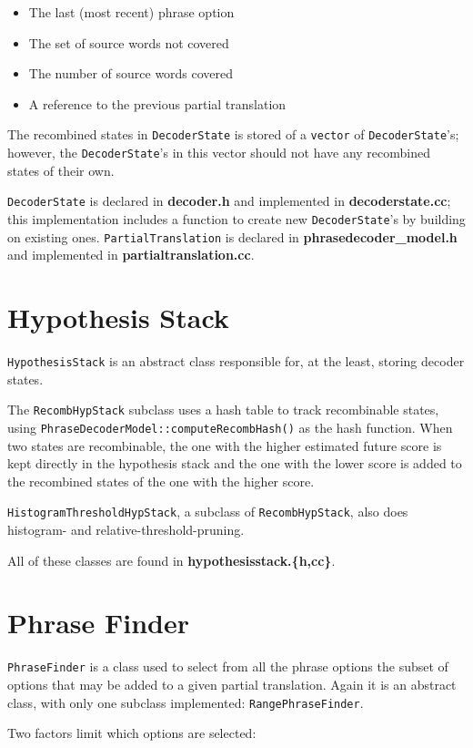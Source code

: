 \documentclass[12pt]{amsart} \usepackage{epsfig} \usepackage{rotating}
\newcommand{\file}{\textbf} \newcommand{\url}{\underline}
\newcommand{\code}{\small\texttt}
\begin{document}
\begin{itemize}
\item The last (most recent) phrase option
\item The set of source words not covered
\item The number of source words covered
\item A reference to the previous partial translation
\end{itemize}

The recombined states in \code{DecoderState} is stored of a \code{vector} of
\code{DecoderState}'s; however, the \code{DecoderState}'s in this vector should
not have any recombined states of their own.

\code{DecoderState} is declared in \file{decoder.h} and implemented in
\file{decoderstate.cc}; this implementation includes a function to create new
\code{DecoderState}'s by building on existing ones.  \code{PartialTranslation}
is declared in \file{phrasedecoder\_model.h} and implemented in
\file{partialtranslation.cc}.

\section{Hypothesis Stack}
\code{HypothesisStack} is an abstract class responsible for, at the least,
storing decoder states.

The \code{RecombHypStack} subclass uses a hash table to track recombinable
states, using \code{PhraseDecoderModel::computeRecombHash()} as the hash
function.  When two states are recombinable, the one with the higher estimated
future score is kept directly in the hypothesis stack and the one with the
lower score is added to the recombined states of the one with the higher score.

\code{HistogramThresholdHypStack}, a subclass of \code{RecombHypStack}, also
does histogram- and relative-threshold-pruning.

All of these classes are found in \file{hypothesisstack.\{h,cc\}}.

\section{Phrase Finder}
\code{PhraseFinder} is a class used to select from all the phrase options the
subset of options that may be added to a given partial translation.  Again it
is an abstract class, with only one subclass implemented:
\code{RangePhraseFinder}.

Two factors limit which options are selected:
\end{document}

